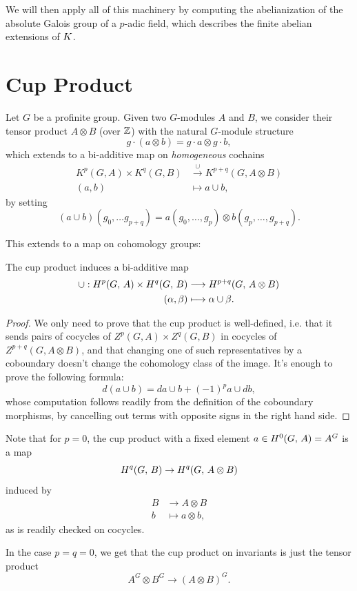 \documentclass[a4paper, oneside]{memoir}
\begin{document}
We will then apply all of this machinery by computing the abelianization of the absolute Galois group of a $p$-adic field, which describes the finite abelian extensions of $K$.

\section{Cup Product}

Let $G$ be a profinite group. Given two $G$-modules $A$ and $B$, we consider their tensor product $A\otimes B$ (over $\mathbb{Z}$) with the natural $G$-module structure
\[
	g\cdot (a\otimes b)=g\cdot a\otimes g\cdot b,
\]
which extends to a bi-additive map on \textit{homogeneous} cochains
\begin{align*}
	K^p(G,A)\times K^q(G,B) & \overset{\cup}{\longrightarrow} K^{p+q}(G,A\otimes B) \\
	(a,b)                   & \mapsto a\cup b,
\end{align*}
by setting
\[
	(a\cup b)(g_0,\dots g_{p+q})=a(g_0,\dots,g_p)\otimes b(g_p,\dots,g_{p+q}).
\]

This extends to a map on cohomology groups:

\begin{theorem}\label{thm:Cup}
	The cup product induces a bi-additive map
	\begin{align*}
		\cup: H^{p}( G, \, A )\times H^{q}( G, \, B ) & \longrightarrow H^{p+q}( G, \, A\otimes B ) \\
		(\alpha,\beta)                     & \longmapsto \alpha\cup\beta.
	\end{align*}
\end{theorem}

\begin{proof}
	We only need to prove that the cup product is well-defined, i.e. that it sends pairs of cocycles of $Z^p(G,A)\times Z^q(G,B)$ in cocycles of $Z^{p+q}(G,A\otimes B)$, and that changing one of such representatives by a coboundary doesn't change the cohomology class of the image.
	It's enough to prove the following formula:
	\begin{equation}\label{eq:DiffCup}
		d(a\cup b)=da\cup b+(-1)^pa\cup d b,
	\end{equation}
	whose computation follows readily from the definition of the coboundary morphisms, by cancelling out terms with opposite signs in the right hand side.
\end{proof}

\begin{remark}\label{rm:Cup0n}
	Note that for $p=0$, the cup product with a fixed element $a\in H^{0}( G, \, A )=A^G$ is a map
	\[
		H^{q}( G, \, B )\to H^{q}( G, \, A\otimes B )
	\]
	induced by
	\begin{align*}
		B & \longrightarrow A\otimes B \\
		b & \longmapsto a\otimes b,
	\end{align*}
	as is readily checked on cocycles.

	In the case $p=q=0$, we get that the cup product on invariants is just the tensor product $$A^G\otimes B^G\to (A\otimes B)^G.$$
\end{remark}
\end{document}
